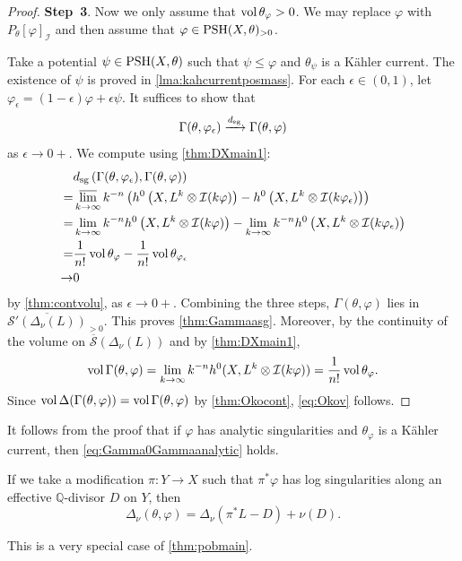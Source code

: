 \begin{proof}
\textbf{Step~3}. Now we only assume that $\operatorname{vol} \theta_{\varphi}>0$.
We may replace $\varphi$ with $P_{\theta}[\varphi]_{\mathcal{I}}$ and then assume that $\varphi\in \mathrm{PSH}(X,\theta)_{>0}$.

Take a potential $\psi\in \mathrm{PSH}(X,\theta)$ such that $\psi \leq \varphi$ and $\theta_{\psi}$ is a Kähler current. The existence of $\psi$ is proved in \cref{lma:kahcurrentposmass}.
For each $\epsilon\in (0,1)$, let $\varphi_{\epsilon}=(1-\epsilon)\varphi+\epsilon\psi$.
It suffices to show that
\[
\Gamma(\theta,\varphi_{\epsilon})\xrightarrow{d_{\mathrm{sg}}}\Gamma(\theta,\varphi)
\]
as $\epsilon \to 0+$.
We compute using \cref{thm:DXmain1}:
\[
\begin{aligned}
    &d_{\mathrm{sg}}\left(\Gamma(\theta,\varphi_{\epsilon}),\Gamma(\theta,\varphi)\right)\\
    =& \varlimsup_{k\to\infty} k^{-n} \left( h^0\left(X,L^k\otimes \mathcal{I}(k\varphi)\right)- h^0\left(X,L^k\otimes \mathcal{I}(k\varphi_{\epsilon})\right) \right)\\
    =& \lim_{k\to\infty}k^{-n}h^0\left(X,L^k\otimes \mathcal{I}(k\varphi)\right)-\lim_{k\to\infty}k^{-n}h^0\left(X,L^k\otimes \mathcal{I}(k\varphi_{\epsilon})\right)\\
    =& \frac{1}{n!}\operatorname{vol} \theta_{\varphi}- \frac{1}{n!}\operatorname{vol} \theta_{\varphi_{\epsilon}}\\
    \to & 0
\end{aligned}
\]
by \cref{thm:contvolu}, as $\epsilon \to 0+$. Combining the three steps, $\Gamma(\theta,\varphi)$ lies in $\overline{\mathcal S'(\Delta_\nu(L))}_{>0}$. This proves \cref{thm:Gammaasg}. Moreover, by the continuity of the volume on $\overline{\mathcal S}(\Delta_\nu(L))$ and by \cref{thm:DXmain1},
\[
\operatorname{vol} \Gamma(\theta,\varphi)=\lim_{k\to\infty}k^{-n}h^0(X,L^k\otimes\mathcal I(k\varphi))=\frac{1}{n!}\operatorname{vol}\theta_\varphi.
\]
Since $\operatorname{vol}\Delta(\Gamma(\theta,\varphi))=\operatorname{vol}\Gamma(\theta,\varphi)$ by \cref{thm:Okocont}, \eqref{eq:Okov} follows.
\end{proof}


\begin{remark}\label{rmk:DeltaanaW0}
It follows from the proof that if $\varphi$ has analytic singularities and $\theta_{\varphi}$ is a Kähler current, then \eqref{eq:Gamma0Gammaanalytic} holds.

If we take a modification $\pi\colon Y\rightarrow X$ such that $\pi^*\varphi$ has log singularities along an effective $\mathbb{Q}$-divisor $D$ on $Y$, then
\begin{equation}\label{eq:DeltaanaW0}
\Delta_{\nu}(\theta,\varphi)=\Delta_{\nu}(\pi^*L-D)+\nu(D).
\end{equation}

This is a very special case of \cref{thm:pobmain}.
\end{remark}







